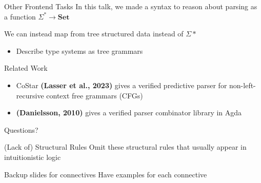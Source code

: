 \documentclass[10pt]{beamer}
\makeatletter
\newif\ifdraft
\newcommand{\todoin}[1]{\ifdraft{\todo[inline]{TODO:\@ #1}}\fi}
\newcommand{\Set}{\mathbf{Set}}
\makeatother
\begin{document}
\begin{frame}{Other Frontend Tasks}
  In this talk, we made a syntax to reason about parsing as a function $\Sigma^{*} \to \Set$

  We can instead map from tree structured data instead of $\Sigma*$
  \begin{itemize}
    \item Describe type systems as tree grammars
  \end{itemize}

  \todoin{elaborate}
\end{frame}

\begin{frame}{Related Work}
  \begin{itemize}
    \item<1-> CoStar \textbf{(Lasser et al., 2023)} gives a verified predictive
          parser for non-left-recursive context free grammars (CFGs)
    \item<2-> \textbf{(Danielsson, 2010)} gives a verified parser combinator library
          in Agda
  \end{itemize}
\end{frame}

\begin{frame}[standout]
  Questions?
\end{frame}

\begin{frame}{(Lack of) Structural Rules}
  Omit these structural rules that usually appear in intuitionistic logic



\end{frame}

\begin{frame}{Backup slides for connectives}
  Have examples for each connective
\end{frame}
\end{document}
